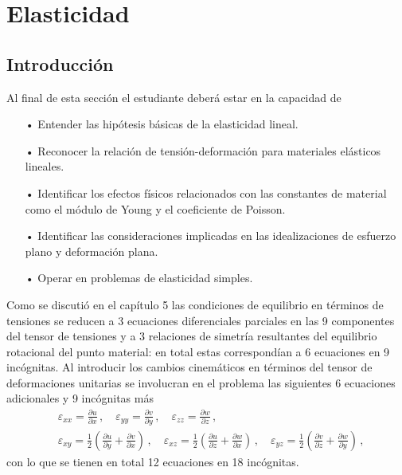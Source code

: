 \documentclass[../notas medios.tex]{subfiles}
\begin{document}
\chapter{Elasticidad}


\graphicspath{{img/Cap6/}}
\section{Introducción}

Al final de esta sección el estudiante deberá estar en la capacidad de
\begin{itemize}
\item[•] Entender las hipótesis básicas de la elasticidad lineal.
\item[•] Reconocer la relación de tensión-deformación para materiales elásticos lineales.
\item[•] Identificar los efectos físicos relacionados con las constantes de material como el módulo de Young y el coeficiente de Poisson.
\item[•] Identificar las consideraciones implicadas en las idealizaciones de esfuerzo plano y deformación plana.
\item[•] Operar en problemas de elasticidad simples.
\end{itemize}

Como se discutió en el capítulo 5 las condiciones de equilibrio en términos de tensiones se reducen a 3 ecuaciones diferenciales parciales en las 9 componentes del tensor de tensiones y a 3 relaciones de simetría resultantes del equilibrio rotacional del punto material: en total estas correspondían a 6 ecuaciones en 9 incógnitas. Al introducir los cambios cinemáticos en términos del tensor de deformaciones unitarias se involucran en el problema las siguientes 6 ecuaciones adicionales y 9 incógnitas más
\begin{align*}
&\varepsilon_{xx} = \frac{\partial u}{\partial x}\, ,\quad
\varepsilon_{yy} = \frac{\partial v}{\partial y}\, ,\quad
\varepsilon_{zz} = \frac{\partial w}{\partial z}\, ,\\
&\varepsilon_{xy} = \frac{1}{2}\left(\frac{\partial u}{\partial y} + \frac{\partial v}{\partial x} \right)\, ,\quad
\varepsilon_{xz} = \frac{1}{2}\left(\frac{\partial u}{\partial z} + \frac{\partial w}{\partial x} \right)\, ,\quad
\varepsilon_{yz} = \frac{1}{2}\left(\frac{\partial v}{\partial z} + \frac{\partial w}{\partial y} \right)\, ,
\end{align*}
con lo que se tienen en total 12 ecuaciones en 18 incógnitas.
\end{document}
